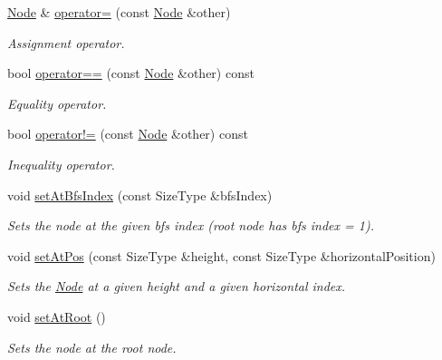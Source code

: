 \begin{DoxyCompactItemize}
\hyperlink{class_complete_binary_tree_1_1_node}{Node} \& \hyperlink{class_complete_binary_tree_1_1_node_ac616ae7ce94b4647585cae0e1cc659b4}{operator=} (const \hyperlink{class_complete_binary_tree_1_1_node}{Node} \&other)
\begin{DoxyCompactList}\small\item\em Assignment operator. \item\end{DoxyCompactList}\item 
bool \hyperlink{class_complete_binary_tree_1_1_node_a32bf1648f0071decd3e84b24c17dfbb3}{operator==} (const \hyperlink{class_complete_binary_tree_1_1_node}{Node} \&other) const 
\begin{DoxyCompactList}\small\item\em Equality operator. \item\end{DoxyCompactList}\item 
bool \hyperlink{class_complete_binary_tree_1_1_node_a156e43bb1fecab5634e53d7a026f4914}{operator!=} (const \hyperlink{class_complete_binary_tree_1_1_node}{Node} \&other) const 
\begin{DoxyCompactList}\small\item\em Inequality operator. \item\end{DoxyCompactList}\item 
void \hyperlink{class_complete_binary_tree_1_1_node_a12eb13f341c8bab833c25b7f745c9ecf}{setAtBfsIndex} (const SizeType \&bfsIndex)
\begin{DoxyCompactList}\small\item\em Sets the node at the given bfs index (root node has bfs index = 1). \item\end{DoxyCompactList}\item 
void \hyperlink{class_complete_binary_tree_1_1_node_a81f250b9aaed4e456f5265f2f83ef769}{setAtPos} (const SizeType \&height, const SizeType \&horizontalPosition)
\begin{DoxyCompactList}\small\item\em Sets the \hyperlink{class_complete_binary_tree_1_1_node}{Node} at a given height and a given horizontal index. \item\end{DoxyCompactList}\item 
\hypertarget{class_complete_binary_tree_1_1_node_a5118757bbeaf315f6b44b22ae9dd6fe4}{
void \hyperlink{class_complete_binary_tree_1_1_node_a5118757bbeaf315f6b44b22ae9dd6fe4}{setAtRoot} ()}
\label{class_complete_binary_tree_1_1_node_a5118757bbeaf315f6b44b22ae9dd6fe4}

\begin{DoxyCompactList}\small\item\em Sets the node at the root node. \item\end{DoxyCompactList}\end{DoxyCompactItemize}
